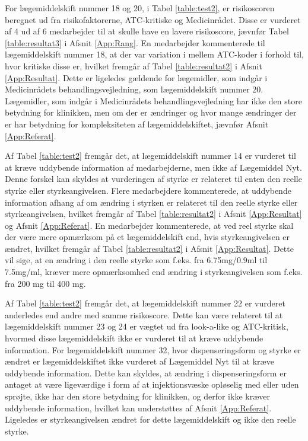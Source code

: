 For lægemiddelskift nummer 18 og 20, i Tabel \ref{table:test2}, er risikoscoren beregnet ud fra risikofaktorerne, ATC-kritiske og Medicinrådet. Disse er vurderet af 4 ud af 6 medarbejder til at skulle have en lavere risikoscore, jævnfør Tabel \ref{table:resultat3} i Afsnit \ref{App:Rang}. En medarbejder kommenterede til lægemiddelskift nummer 18, at der var variation
i mellem ATC-koder i forhold til, hvor kritiske disse er, hvilket fremgår af Tabel \ref{table:resultat2} i Afsnit \ref{App:Resultat}. Dette er ligeledes gældende for lægemidler, som indgår i Medicinrådets behandlingsvejledning, som lægemiddelskift nummer 20. Lægemidler, som indgår i Medicinrådets behandlingsvejledning har ikke den store betydning for klinikken, men om der er ændringer og hvor mange ændringer der er har betydning for kompleksiteten af lægemiddelskiftet, jævnfør Afsnit \ref{App:Referat}.

Af Tabel \ref{table:test2} fremgår det, at lægemiddelskift nummer 14 er vurderet til at kræve uddybende information af medarbejderne, men ikke af Lægemiddel Nyt. Denne forskel kan skyldes at vurderingen af styrke er relateret til enten den reelle styrke eller styrkeangivelsen. Flere medarbejdere kommenterede, at uddybende information afhang af om ændring i styrken er relateret til den reelle styrke eller styrkeangivelsen, hvilket fremgår af Tabel \ref{table:resultat2} i Afsnit \ref{App:Resultat} og Afsnit \ref{App:Referat}. En medarbejder kommenterede, at ved reel styrke skal der være mere opmærksom på et lægemiddelskift end, hvis styrkeangivelsen er ændret, hvilket fremgår af Tabel \ref{table:resultat2} i Afsnit \ref{App:Resultat}. Dette vil sige, at en ændring i den reelle styrke som f.eks. fra 6.75mg/0.9ml til 7.5mg/ml, kræver mere opmærksomhed end ændring i styrkeangivelsen som f.eks. fra 200 mg til 400 mg. 

Af Tabel \ref{table:test2} fremgår det, at lægemiddelskift nummer 22 er vurderet anderledes end andre med samme risikoscore. Dette kan være relateret til at lægemiddelskift nummer 23 og 24 er vægtet ud fra look-a-like og ATC-kritisk, hvormed disse lægemiddelskift ikke er vurderet til at kræve uddybende information. For lægemiddelskift nummer 32, hvor dispenseringsform og styrke er ændret er lægemiddelskiftet ikke vurderet af Lægemiddel Nyt til at kræve uddybende information. Dette kan skyldes, at ændring i dispenseringsform er antaget at være ligeværdige i form af at injektionsvæske opløselig med eller uden sprøjte, ikke har den store betydning for klinikken, og derfor ikke kræver uddybende information, hvilket kan understøttes af Afsnit \ref{App:Referat}.
Ligeledes er styrkeangivelsen ændret for dette lægemiddelskift og ikke den reelle styrke. 

